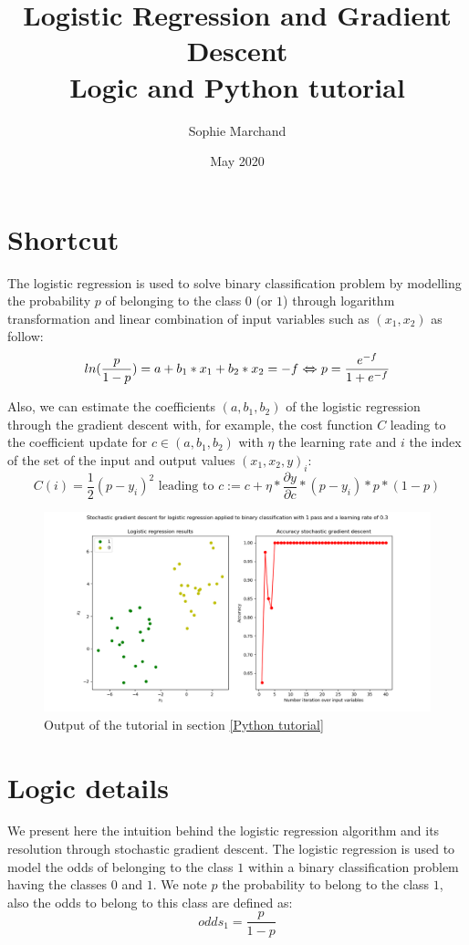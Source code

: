 \documentclass{article}
\title{Logistic Regression and Gradient Descent \\ Logic and Python tutorial}
\author{Sophie Marchand}
\date{May 2020}
\begin{document}
\maketitle

\section{Shortcut}
\begin{tcolorbox}
The logistic regression is used to solve binary classification problem by modelling the probability \(p\) of belonging to the class \(0\) (or \(1\)) through logarithm transformation and linear combination of input variables such as \((x_{1}, x_{2})\) as follow:
\[ln(\frac{p}{1-p}) = a + b_{1} * x_{1} + b_{2} * x_{2} = -f \xLeftrightarrow[]{} p =\frac{e^{-f}}{1 + e^{-f}}\]

Also, we can estimate the coefficients \((a, b_{1}, b_{2})\) of the logistic regression through the gradient descent with, for example, the cost function \(C\) leading to the coefficient update for \(c \in(a, b_{1}, b_{2})\) with \(\eta\) the learning rate and \(i\) the index of the set of the input and output values \((x_{1}, x_{2}, y)_{i}\):
\[C(i) = \frac{1}{2}(p-y_{i})^{2} \text{  leading to  } c:=c + \eta*\frac{\partial y}{\partial c}*(p-y_{i})*p*(1-p)\]
\end{tcolorbox}

\begin{figure}[h]
\centering
\includegraphics[width=1.05\textwidth]{Figure_LogisticRegressionGradientDescent}
\caption{Output of the tutorial in section \ref{Python tutorial}}
\end{figure}

\section{Logic details}
We present here the intuition behind the logistic regression algorithm and its resolution through stochastic gradient descent. The logistic regression is used to model the odds of belonging to the class \(1\) within a binary classification problem having the classes \(0\) and \(1\). We note \(p\) the probability to belong to the class \(1\), also the odds to belong to this class are defined as:
\begin{equation} \label{1}
    odds_{1} = \frac{p}{1-p}
\end{equation}
\end{document}
